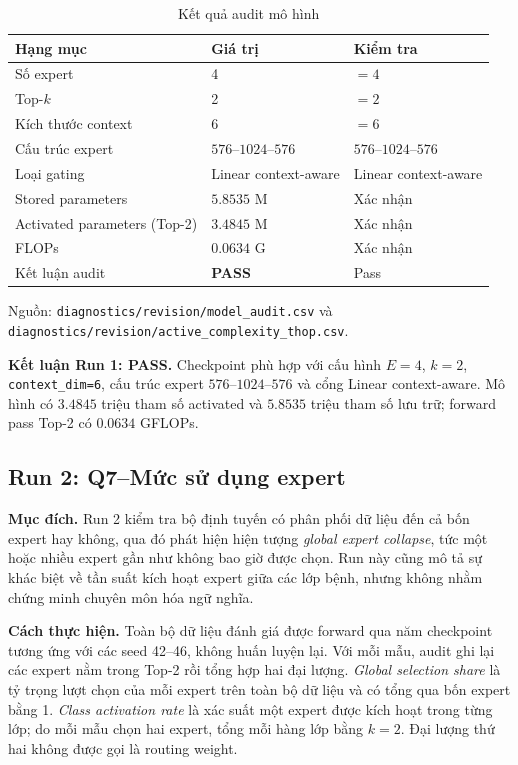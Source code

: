 \documentclass[conference]{IEEEtran}
\begin{document}
\begin{table}[H]
\caption{Kết quả audit mô hình}
\label{tab:audit}
\centering
\footnotesize
\begin{tabular}{@{}p{}p{}p{}@{}}
\toprule
Hạng mục & Giá trị & Kiểm tra \\
\midrule
Số expert & 4 & $=4$ \\
Top-$k$ & 2 & $=2$ \\
Kích thước context & 6 & $=6$ \\
Cấu trúc expert & $576$--$1024$--$576$ & $576$--$1024$--$576$ \\
Loại gating & Linear context-aware & Linear context-aware \\
Stored parameters & $5.8535$ M & Xác nhận \\
Activated parameters (Top-2) & $3.4845$ M & Xác nhận \\
FLOPs & $0.0634$ G & Xác nhận \\
Kết luận audit & \textbf{PASS} & Pass \\
\bottomrule
\end{tabular}
\vspace{2pt}

\raggedright\scriptsize Nguồn: \texttt{diagnostics/revision/model\_audit.csv}
và \texttt{diagnostics/revision/active\_complexity\_thop.csv}.
\end{table}

\textbf{Kết luận Run 1: PASS.} Checkpoint phù hợp với cấu hình $E=4$, $k=2$,
\texttt{context\_dim=6}, cấu trúc expert $576$--$1024$--$576$ và cổng
Linear context-aware. Mô hình có $3.4845$ triệu tham số activated và
$5.8535$ triệu tham số lưu trữ; forward pass Top-2 có $0.0634$ GFLOPs.

\subsection{Run 2: Q7--Mức sử dụng expert}

\textbf{Mục đích.} Run 2 kiểm tra bộ định tuyến có phân phối dữ liệu đến cả
bốn expert hay không, qua đó phát hiện hiện tượng \emph{global expert
collapse}, tức một hoặc nhiều expert gần như không bao giờ được chọn. Run này
cũng mô tả sự khác biệt về tần suất kích hoạt expert giữa các lớp bệnh, nhưng
không nhằm chứng minh chuyên môn hóa ngữ nghĩa.

\textbf{Cách thực hiện.} Toàn bộ dữ liệu đánh giá được forward qua năm
checkpoint tương ứng với các seed 42--46, không huấn luyện lại. Với mỗi mẫu,
audit ghi lại các
expert nằm trong Top-2 rồi tổng hợp hai đại lượng. \emph{Global selection
share} là tỷ trọng lượt chọn của mỗi expert trên toàn bộ dữ liệu và có tổng
qua bốn expert bằng 1. \emph{Class activation rate} là xác suất một expert
được kích hoạt trong từng lớp; do mỗi mẫu chọn hai expert, tổng mỗi hàng lớp
bằng $k=2$. Đại lượng thứ hai không được gọi là routing weight.
\end{document}
